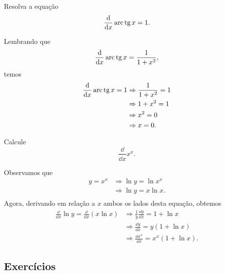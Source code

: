 \begin{exeresol}
  Resolva a equação
  \begin{equation}
    \frac{\mathrm{d}}{\mathrm{d} x}\operatorname{arc}\operatorname{tg} x = 1.
  \end{equation}
\end{exeresol}
\begin{resol}
  Lembrando que
  \begin{equation}
    \frac{\mathrm{d}}{\mathrm{d} x}\operatorname{arc}\operatorname{tg} x = \frac{1}{1+x^2},
  \end{equation}
  temos
  \begin{align}
    \frac{\mathrm{d}}{\mathrm{d} x}\operatorname{arc}\operatorname{tg} x = 1 &\Rightarrow \frac{1}{1+x^2}=1\\
                                   &\Rightarrow 1+x^2 = 1 \\
                                   &\Rightarrow x^2 = 0 \\
                                   &\Rightarrow x = 0.
  \end{align}
\end{resol}

\begin{exeresol}
  Calcule
  \begin{equation}
    \frac{\dd}{\dd x}x^x.
  \end{equation}
\end{exeresol}
\begin{resol}
  Observamos que
  \begin{align}
    y = x^x &\Rightarrow \ln y = \ln x^x \\
            &\Rightarrow \ln y = x\ln x. \\
  \end{align}
  Agora, derivando em relação a $x$ ambos os lados desta equação, obtemos
  \begin{align}
    \frac{\dd}{\dd x}\ln y = \frac{\dd}{\dd x}\left(x\ln x\right) &\Rightarrow \frac{1}{y}\frac{\dd y}{\dd x} = 1 + \ln x \\
                                                                  &\Rightarrow \frac{\dd y}{\dd x} = y(1 + \ln x) \\
                                                                  &\Rightarrow \frac{\dd x^x}{\dd x} = x^x(1 + \ln x).
  \end{align}
\end{resol}

\subsection*{Exercícios}

